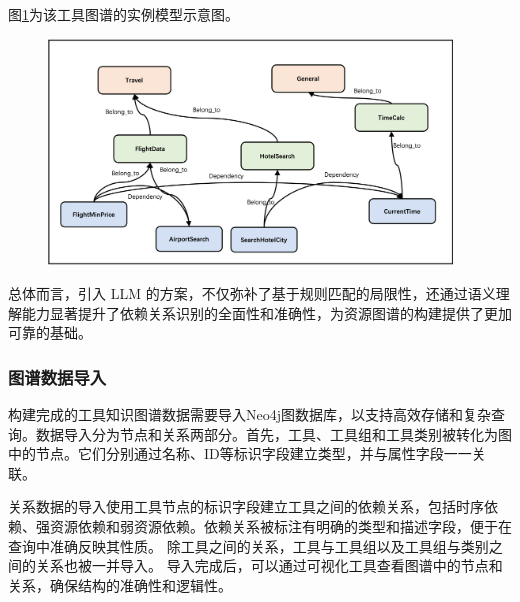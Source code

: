 图\ref{fig:ch3-knowledge-graph-instance-model}为该工具图谱的实例模型示意图。

\begin{figure}[H]
    \vspace{1em}
    \centering
    \setlength{\abovecaptionskip}{10pt} %
    \includegraphics[height=6cm]{../assets/图谱实例模型.png}
    \label{fig:ch3-knowledge-graph-instance-model}
\end{figure}

总体而言，引入 LLM 的方案，不仅弥补了基于规则匹配的局限性，还通过语义理解能力显著提升了依赖关系识别的全面性和准确性，为资源图谱的构建提供了更加可靠的基础。

\subsubsection{图谱数据导入}

构建完成的工具知识图谱数据需要导入Neo4j图数据库，以支持高效存储和复杂查询。数据导入分为节点和关系两部分。首先，工具、工具组和工具类别被转化为图中的节点。它们分别通过名称、ID等标识字段建立类型，并与属性字段一一关联。

关系数据的导入使用工具节点的标识字段建立工具之间的依赖关系，包括时序依赖、强资源依赖和弱资源依赖。依赖关系被标注有明确的类型和描述字段，便于在查询中准确反映其性质。
除工具之间的关系，工具与工具组以及工具组与类别之间的关系也被一并导入。
导入完成后，可以通过可视化工具查看图谱中的节点和关系，确保结构的准确性和逻辑性。

